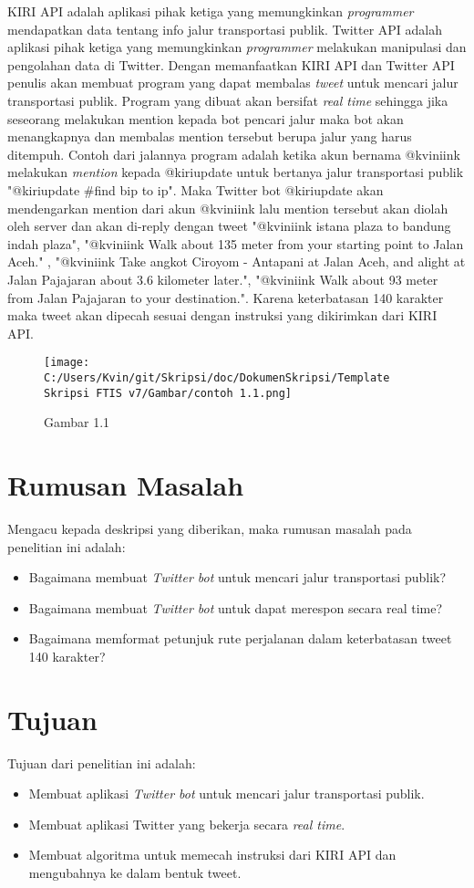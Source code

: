 KIRI API adalah aplikasi pihak ketiga yang memungkinkan \textit{programmer} mendapatkan data tentang info jalur transportasi publik. Twitter API adalah aplikasi pihak ketiga yang memungkinkan \textit{programmer} melakukan manipulasi dan pengolahan data di Twitter. Dengan memanfaatkan KIRI API dan Twitter API penulis akan membuat program yang dapat membalas \textit{tweet} untuk mencari jalur transportasi publik. Program yang dibuat akan bersifat \textit{real time} sehingga jika seseorang melakukan mention kepada bot pencari jalur maka bot akan menangkapnya dan membalas mention tersebut berupa jalur yang harus ditempuh. Contoh dari jalannya program adalah ketika akun bernama @kviniink melakukan \textit{mention} kepada @kiriupdate untuk bertanya jalur transportasi publik "@kiriupdate #find bip to ip". Maka Twitter bot @kiriupdate akan mendengarkan mention dari akun @kviniink lalu mention tersebut akan diolah oleh server dan akan di-reply dengan tweet "@kviniink istana plaza to bandung indah plaza", "@kviniink Walk about 135 meter from your starting point to Jalan Aceh." , "@kviniink Take angkot Ciroyom - Antapani at Jalan Aceh, and alight at Jalan Pajajaran about 3.6 kilometer later.", "@kviniink Walk about 93 meter from Jalan Pajajaran to your destination.". Karena keterbatasan 140 karakter maka tweet akan dipecah sesuai dengan instruksi yang dikirimkan dari KIRI API.

\begin{figure}
	\centering
		\texttt{[image: C:/Users/Kvin/git/Skripsi/doc/DokumenSkripsi/Template Skripsi FTIS v7/Gambar/contoh 1.1.png]}
	\caption{Gambar 1.1}
	\label{fig: Gambar 1.1}
\end{figure}


\section{Rumusan Masalah}
Mengacu kepada deskripsi yang diberikan, maka rumusan masalah pada penelitian ini adalah:
\begin{itemize}
	\item Bagaimana membuat \textit{Twitter bot} untuk mencari jalur transportasi publik?
	\item Bagaimana membuat \textit{Twitter bot} untuk dapat merespon secara real time?
	\item Bagaimana memformat petunjuk rute perjalanan dalam keterbatasan tweet 140 karakter?
\end{itemize}

\section{Tujuan}
Tujuan dari penelitian ini adalah:
\begin{itemize}
	\item Membuat aplikasi \textit{Twitter bot} untuk mencari jalur transportasi publik.
	\item Membuat aplikasi Twitter yang bekerja secara \textit{real time}.
	\item Membuat algoritma untuk memecah instruksi dari KIRI API dan mengubahnya ke dalam bentuk tweet.
\end{itemize}

